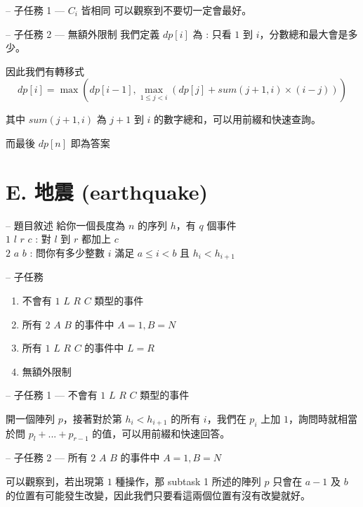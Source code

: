 \documentclass[hyperref,UTF8,notheorems,xcolor={dvipsnames}]{beamer}
\newcommand{\btitle}[1]{{\secname} -- #1}
\theoremstyle{definition}
\begin{document}
\begin{frame}[fragile]{\btitle{子任務 1 --- $C_i$ 皆相同}}
	可以觀察到不要切一定會最好。
\end{frame}

\begin{frame}[fragile]{\btitle{子任務 2 --- 無額外限制}}
	我們定義 $dp[i]$ 為 : 只看 $1$ 到 $i$，分數總和最大會是多少。  
	\pause

	因此我們有轉移式 $$dp[i] = \max(dp[i - 1], \max_{1 \le j < i}{(dp[j] + sum(j + 1, i) \times (i - j))})$$

	其中 $sum(j + 1, i)$ 為 $j + 1$ 到 $i$ 的數字總和，可以用前綴和快速查詢。

	而最後 $dp[n]$ 即為答案

\end{frame}


\section{E. 地震 (earthquake)}

\begin{frame}[fragile]{\btitle{題目敘述}}
	給你一個長度為 $n$ 的序列 $h$，有 $q$ 個事件  \\
	$1$ $l$ $r$ $c$ : 對 $l$ 到 $r$ 都加上 $c$  \\
	$2$ $a$ $b$ : 問你有多少整數 $i$ 滿足 $a \le i < b$ 且 $h_i < h_{i + 1}$
\end{frame}

\begin{frame}[fragile]{\btitle{子任務}}
	\begin{enumerate}
		\item 不會有 $1$ $L$ $R$ $C$ 類型的事件
		\item 所有 $2$ $A$ $B$ 的事件中 $A = 1, B = N$
		\item 所有 $1$ $L$ $R$ $C$ 的事件中 $L = R$
		\item 無額外限制
	\end{enumerate}
\end{frame}

\begin{frame}[fragile]{\btitle{子任務 1 --- 不會有 $1$ $L$ $R$ $C$ 類型的事件}}
	
	開一個陣列 $p$，接著對於第 $h_i < h_{i + 1}$ 的所有 $i$，我們在 $p_i$ 上加 $1$，詢問時就相當於問 $p_l + ... + p_{r - 1}$ 的值，可以用前綴和快速回答。

\end{frame}

\begin{frame}[fragile]{\btitle{子任務 2 --- 所有 $2$ $A$ $B$ 的事件中 $A = 1, B = N$}}
	
	可以觀察到，若出現第 $1$ 種操作，那 subtask 1 所述的陣列 $p$ 只會在 $a - 1$ 及 $b$ 的位置有可能發生改變，因此我們只要看這兩個位置有沒有改變就好。

\end{frame}
\end{document}
